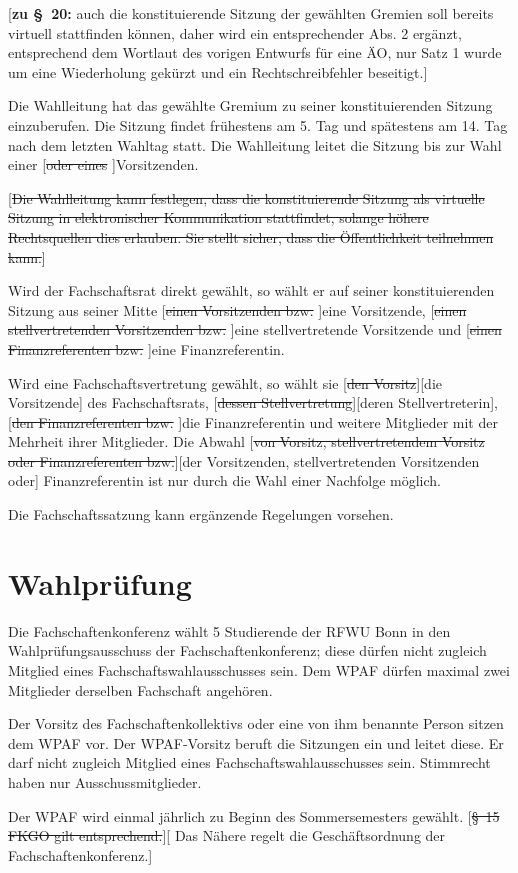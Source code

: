 \documentclass[%
draft,%
multilinesections%
]{fswo}
\newcommand\oldT[1]  {{\color{Gray}[\st{#1}]}}
\newcommand\newT[1]  {{\color{Green}[#1]}}
\newcommand\bemFr[1] {{\color{Red}[#1]}}
\newcommand\oldT[1]{}%
\newcommand\newT[1]{#1}
\newcommand\bemFr[1]{}%
\newcommand\change[2]{\oldT{#1}\newT{#2}}
\begin{document}
\bemFr{\textbf{zu \S~20:}
auch die konstituierende Sitzung der gewählten Gremien soll bereits virtuell stattfinden können, daher wird ein entsprechender Abs. 2 ergänzt, entsprechend dem Wortlaut des vorigen Entwurfs für eine ÄO, nur Satz 1 wurde um eine Wiederholung gekürzt und ein Rechtschreibfehler beseitigt.}

\begin{contract}
\label{cls-konstituierung}
Die Wahlleitung hat das gewählte Gremium zu seiner konstituierenden Sitzung einzuberufen.
Die Sitzung findet frühestens am 5. Tag und spätestens am 14. Tag nach dem letzten Wahltag statt.
Die Wahlleitung leitet die Sitzung bis zur Wahl einer \oldT{oder eines }Vorsitzenden.

\oldT{Die Wahlleitung kann festlegen, dass die konstituierende Sitzung als virtuelle Sitzung in elektronischer Kommunikation stattfindet, solange höhere Rechtsquellen dies erlauben.
Sie stellt sicher, dass die Öffentlichkeit teilnehmen kann.}

Wird der Fachschaftsrat direkt gewählt, so wählt er auf seiner konstituierenden Sitzung aus seiner Mitte \oldT{einen Vorsitzenden bzw. }eine Vorsitzende, \oldT{einen stellvertretenden Vorsitzenden bzw. }eine stellvertretende Vorsitzende und \oldT{einen Finanzreferenten bzw. }eine Finanzreferentin.

Wird eine Fachschaftsvertretung gewählt, so wählt sie \change{den Vorsitz}{die Vorsitzende} des Fachschaftsrats, \change{dessen Stellvertretung}{deren Stellvertreterin}, \oldT{den Finanzreferenten bzw. }die Finanzreferentin und weitere Mitglieder mit der Mehrheit ihrer Mitglieder.
Die Abwahl \change{von Vorsitz, stellvertretendem Vorsitz oder Finanzreferenten bzw.}{der Vorsitzenden, stellvertretenden Vorsitzenden oder} Finanzreferentin ist nur durch die Wahl einer Nachfolge möglich.

Die Fachschaftssatzung kann ergänzende Regelungen vorsehen.
\end{contract}

\section{Wahlprüfung}
\begin{contract}
Die Fachschaftenkonferenz wählt 5 Studierende der RFWU Bonn in den Wahlprüfungsausschuss der Fachschaftenkonferenz;
diese dürfen nicht zugleich Mitglied eines Fachschaftswahlausschusses sein.
Dem WPAF dürfen maximal zwei Mitglieder derselben Fachschaft angehören.

Der Vorsitz des Fachschaftenkollektivs oder eine von ihm benannte Person sitzen dem WPAF vor.
Der WPAF-Vorsitz beruft die Sitzungen ein und leitet diese.
Er darf nicht zugleich Mitglied eines Fachschaftswahlausschusses sein.
Stimmrecht haben nur Ausschussmitglieder.

Der WPAF wird einmal jährlich zu Beginn des Sommersemesters gewählt.
\change{\S~15 FKGO gilt entsprechend.}{%
Das Nähere regelt die Geschäftsordnung der Fachschaftenkonferenz.}
\end{contract}
\end{document}
